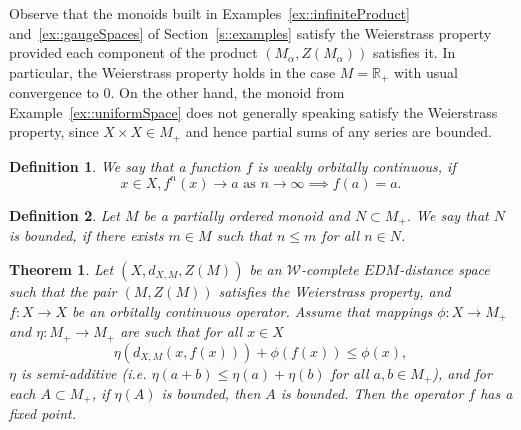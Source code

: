 \documentclass[12pt]{amsart}          %
\newtheorem{theorem}{Theorem}
\newtheorem{definition}{Definition}
\newcommand{\RR}{\mathbb R}
\begin{document}
Observe that the monoids built in Examples~\ref{ex::infiniteProduct} and~\ref{ex::gaugeSpaces} of Section~\ref{s::examples} satisfy the Weierstrass property provided each component of the product $(M_\alpha, Z(M_\alpha))$ satisfies it. In particular, the Weierstrass property holds in the case $M = \RR_+$ with usual convergence to $0$. On the other hand, the monoid from Example~\ref{ex::uniformSpace} does not generally speaking satisfy the Weierstrass property, since $X\times X\in M_+$ and hence partial sums of any series are bounded.

\begin{definition}
We say that a function $f$ is weakly orbitally continuous, if 
\begin{equation*}
    x\in X, f^n(x)\to a \text { as } n\to\infty \implies f(a) =a.
\end{equation*}
\end{definition}
\begin{definition}
Let $M$ be a partially ordered monoid and $N\subset M_+$. We say that $N$ is bounded, if there exists $m\in M$ such that $n\leq m$ for all $n\in N$.  
\end{definition}
\begin{theorem}\label{th::caristiType}
Let $(X,d_{X,M},Z(M))$ be an $\mathcal{W}$-complete {$EDM$-distance} space such that the pair $(M, Z(M))$ satisfies the Weierstrass property, and $f\colon X\to X$ be an orbitally continuous operator. 
Assume that mappings $\phi \colon X\to M_+$ and $\eta\colon M_+\to M_+$ are such that for all $x\in X$
$$
\eta(d_{X,M}(x,f(x))) + \phi(f(x))\le \phi(x),
$$
$\eta$ is semi-additive (i.e. $\eta(a+b)\leq \eta(a)+\eta(b)$ for all $a,b\in M_+$), and for each  $A\subset M_+$, if $\eta(A)$  is bounded, then $A$  is bounded. Then the operator $f$ has a fixed point. 
\end{theorem}
\end{document}
